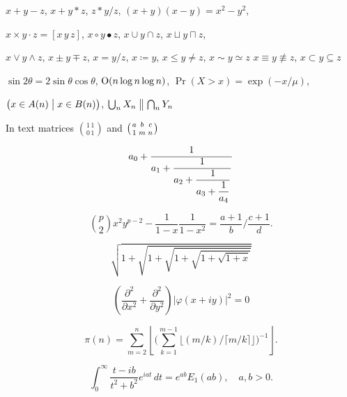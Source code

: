 
\newcommand*\mat[1]{\bm{#1}}


$x + y - z$, \quad $x + y * z$, \quad $z * y / z$, \quad
$(x+y)(x-y) = x^2 - y^2$,

$x \times y \cdot z = [x\, y\, z]$, \quad $x\circ y \bullet z$, \quad
$x\cup y \cap z$, \quad $x\sqcup y \sqcap z$, \quad

$x \vee y \wedge z$, \quad $x\pm y\mp z$, \quad
$x=y/z$, \quad $x \coloneq y$, \quad $x\le y \ne z$, \quad $x \sim y \simeq z$
$x \equiv y \nequiv z$, \quad $x\subset y \subseteq z$

$\sin2\theta=2\sin\theta\cos\theta$, \quad
$\hbox{O}(n\log n\log n)$, \quad
$\Pr(X>x)=\exp(-x/\mu)$,

$\bigl(x\in A(n)\bigm|x\in B(n)\bigr)$, \quad
$\bigcup_n X_n\bigm\|\bigcap_n Y_n$


In text matrices $\binom{1\,1}{0\,1}$ and $\bigl(\genfrac{}{}{0pt}{}{a}{1}\genfrac{}{}{0pt}{}{b}{m}\genfrac{}{}{0pt}{}{c}{n}\bigr)$


\[a_0+\frac1{\displaystyle a_1 +
{\strut \frac1{\displaystyle a_2 +
{\strut \frac1{\displaystyle a_3 +
{\strut \frac1{\displaystyle a_4}}}}}}}\]


\[\binom{p}{2}x^2y^{p-2} - \frac1{1 - x}\frac{1}{1 - x^2}
=
\frac{a+1}{b}\bigg/\frac{c+1}{d}.\]


\[\sqrt{1+\sqrt{1+\sqrt{1+\sqrt{1+\sqrt{1+x}}}}}\]


\[\left(\frac{\partial^2}{\partial x^2} + \frac{\partial^2}{\partial y^2}\right)
\bigl|\varphi(x+iy)\bigr|^2=0\]



\[\pi(n)=\sum_{m=2}^n\left\lfloor\Biggl(\sum_{k=1}^{m-1}\bigl
\lfloor(m/k)\big/\lceil m/k\rceil\bigr\rfloor\Biggr)^{-1}\right\rfloor.\]


\[\int_0^\infty \frac{t - i b}{t^2 + b^2}e^{iat}\,dt=e^{ab}E_1(ab), \quad
a,b > 0.\]

